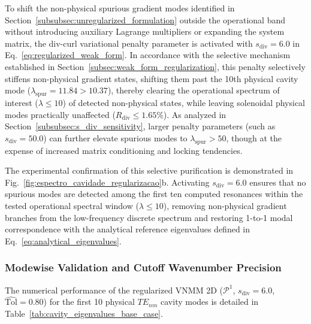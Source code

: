 \documentclass[preprint,12pt]{elsarticle}
\begin{document}
To shift the non-physical spurious gradient modes identified in Section~\ref{subsubsec:unregularized_formulation} outside the operational band without introducing auxiliary Lagrange multipliers or expanding the system matrix, the div-curl variational penalty parameter is activated with $s_{\mathrm{div}} = 6.0$ in Eq.~\eqref{eq:regularized_weak_form}. In accordance with the selective mechanism established in Section~\ref{subsec:weak_form_regularization}, this penalty selectively stiffens non-physical gradient states, shifting them past the 10th physical cavity mode ($\lambda_{\mathrm{spur}} = 11.84 > 10.37$), thereby clearing the operational spectrum of interest ($\lambda \le 10$) of detected non-physical states, while leaving solenoidal physical modes practically unaffected ($R_{\mathrm{div}} \le 1.65\%$). As analyzed in Section~\ref{subsubsec:s_div_sensitivity}, larger penalty parameters (such as $s_{\mathrm{div}} = 50.0$) can further elevate spurious modes to $\lambda_{\mathrm{spur}} > 50$, though at the expense of increased matrix conditioning and locking tendencies.

The experimental confirmation of this selective purification is demonstrated in Fig.~\ref{fig:espectro_cavidade_regularizacao}b. Activating $s_{\mathrm{div}} = 6.0$ ensures that no spurious modes are detected among the first ten computed resonances within the tested operational spectral window ($\lambda \le 10$), removing non-physical gradient branches from the low-frequency discrete spectrum and restoring 1-to-1 modal correspondence with the analytical reference eigenvalues defined in Eq.~\eqref{eq:analytical_eigenvalues}.

\subsubsection{Modewise Validation and Cutoff Wavenumber Precision}
\label{subsubsec:modewise_validation}

The numerical performance of the regularized VNMM 2D ($\mathcal{P}^1$, $s_{\mathrm{div}} = 6.0$, $\widehat{\mathrm{Tol}} = 0.80$) for the first 10 physical $TE_{nm}$ cavity modes is detailed in Table~\ref{tab:cavity_eigenvalues_base_case}.
\end{document}
